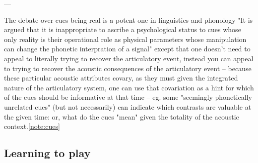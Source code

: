 \begin{multicols}{2}

---

The debate over cues being real is a potent one in linguistics and phonology "It is argued that it is inappropriate to ascribe a psychological status to cues whose only reality is their operational role as physical parameters whose manipulation can change the phonetic interpration of a signal"\cite{Bailey1980} except that one doesn't need to appeal to literally trying to recover the articulatory event, instead you can appeal to trying to recover the acoustic consequences of the articulatory event -- because these particular acoustic attributes covary, as they must given the integrated nature of the articulatory system, one can use that covariation as a hint for which of the cues should be informative at that time -- eg. some "seemingly phonetically unrelated cues" (but not necessarily) can indicate which contrasts are valuable at the given time: or, what do the cues "mean" given the totality of the acoustic context.\ref{note:cues}



\subsection{Learning to play}





\end{multicols}
